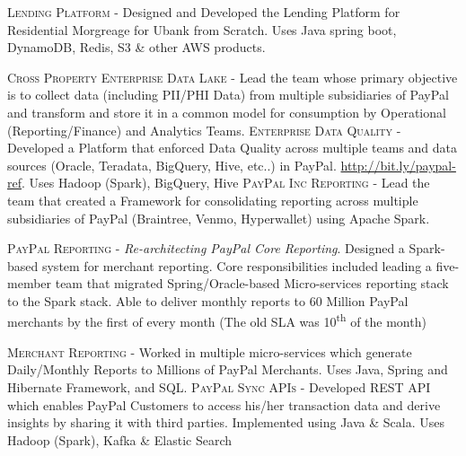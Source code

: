\documentclass[11pt, a4paper, sans]{moderncv}
\begin{document}
{\textsc{Lending Platform} - Designed and Developed the Lending Platform for Residential Morgreage for Ubank from Scratch. Uses Java spring boot, DynamoDB, Redis, S3 \& other AWS products. \newline} 

{\textsc{Cross Property Enterprise Data Lake} - Lead the team whose primary objective is to collect data (including PII/PHI Data) from multiple subsidiaries of PayPal and transform and store it in a common model for consumption by Operational (Reporting/Finance) and Analytics Teams. \newline
\newline \textsc{Enterprise Data Quality} - Developed a Platform that enforced Data Quality across multiple teams and data sources (Oracle, Teradata, BigQuery, Hive, etc..) in PayPal. \url{http://bit.ly/paypal-ref}. Uses Hadoop (Spark), BigQuery, Hive \newline
\newline \textsc{PayPal Inc Reporting} - Lead the team that created a Framework for consolidating reporting across multiple subsidiaries of PayPal (Braintree, Venmo, Hyperwallet) using Apache Spark. \newline} 

{\textsc{PayPal Reporting} - \textit{Re-architecting PayPal Core Reporting}.  Designed a Spark-based system for merchant reporting. Core responsibilities included leading a five-member team that migrated Spring/Oracle-based Micro-services reporting stack to the Spark stack. 
Able to deliver monthly reports to 60 Million PayPal merchants by the first of every month (The old SLA was 10\textsuperscript{th} of the month)  \newline} 

{\textsc{Merchant Reporting} - Worked in multiple micro-services which generate Daily/Monthly Reports to Millions of PayPal Merchants. Uses Java, Spring and Hibernate Framework, and SQL. \newline 
\newline \textsc{PayPal Sync APIs} - Developed REST API which enables PayPal Customers to access his/her transaction data and derive insights by sharing it with third parties. Implemented using Java \& Scala. Uses Hadoop (Spark), Kafka \& Elastic Search \newline} 
\end{document}
